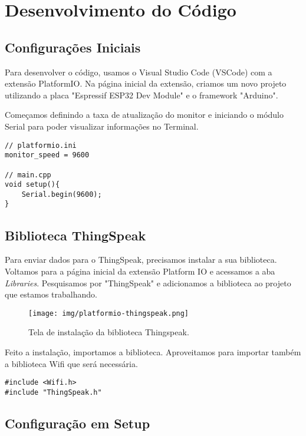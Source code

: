 \section{Desenvolvimento do Código}

\subsection{Configurações Iniciais}

Para desenvolver o código, usamos o Visual Studio Code (VSCode) com a extensão PlatformIO. Na página inicial da extensão, criamos um novo projeto utilizando a placa "Espressif ESP32 Dev Module" e o framework "Arduino".

Começamos definindo a taxa de atualização do monitor e iniciando o módulo Serial para poder visualizar informações no Terminal.

\begin{lstlisting}
// platformio.ini
monitor_speed = 9600

// main.cpp
void setup(){
    Serial.begin(9600);
}
\end{lstlisting}

\subsection{Biblioteca ThingSpeak}

Para enviar dados para o ThingSpeak, precisamos instalar a sua biblioteca. Voltamos para a página inicial da extensão Platform IO e acessamos a aba \textit{Libraries}. Pesquisamos por "ThingSpeak" e adicionamos a biblioteca ao projeto que estamos trabalhando.

\begin{figure}[H]
    \centering
    \texttt{[image: img/platformio-thingspeak.png]}
    \caption{Tela de instalação da biblioteca Thingspeak.}
    \label{fig:platformio-thingspeak}
\end{figure}

Feito a instalação, importamos a biblioteca. Aproveitamos para importar também a biblioteca Wifi que será necessária.
\begin{lstlisting}
#include <Wifi.h>
#include "ThingSpeak.h"
\end{lstlisting}

\subsection{Configuração em Setup}

